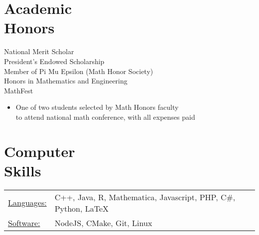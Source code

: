 \documentclass[resmargin, line]{res}
\begin{document}
\begin{resume}
\section{Academic \\ Honors} 
National Merit Scholar \\
President's Endowed Scholarship \\
Member of Pi Mu Epsilon (Math Honor Society) \\
Honors in Mathematics and Engineering \\
MathFest
\begin{itemize}
    \item One of two students selected by Math Honors faculty \\ to attend national math conference, with all expenses paid
\end{itemize}


\section{Computer \\ Skills}
\begin{tabular}{l p{3in}}
\underline{Languages:} & C++, Java, R, Mathematica, 
Javascript, PHP, C\#, Python, \LaTeX \\
\underline{Software:} &  NodeJS, CMake, Git, Linux
\end{tabular}

\end{resume} 
\end{document}
